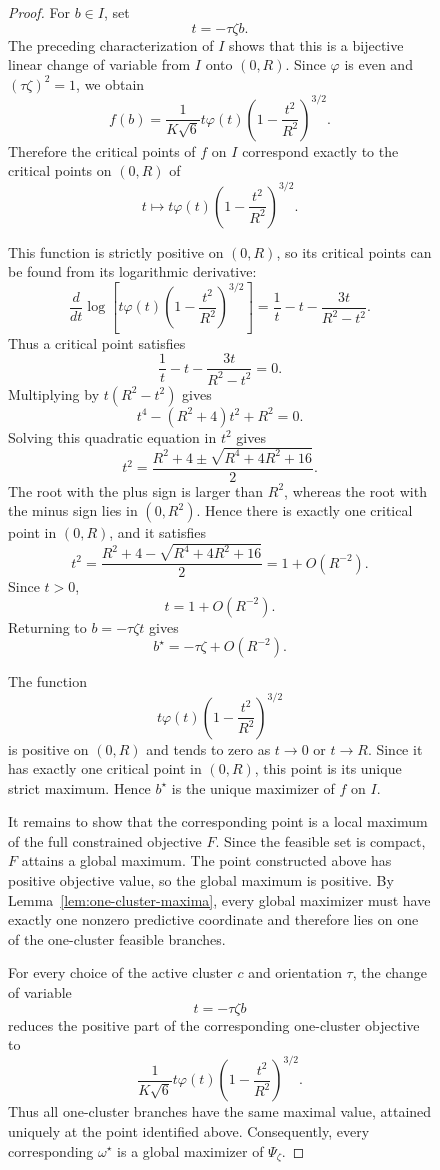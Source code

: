 \documentclass{article}
\begin{document}
\begin{figure}
\begin{proof}
For $b\in I$, set
\[
    t=-\tau\zeta b.
\]
The preceding characterization of $I$ shows that this is a bijective linear
change of variable from $I$ onto $(0,R)$. Since $\varphi$ is even and
$(\tau\zeta)^2=1$, we obtain
\[
    f(b)
    =
    \frac{1}{K\sqrt6}
    t\varphi(t)
    \left(1-\frac{t^2}{R^2}\right)^{3/2}.
\]
Therefore the critical points of $f$ on $I$ correspond exactly to the
critical points on $(0,R)$ of
\[
    t\longmapsto
    t\varphi(t)
    \left(1-\frac{t^2}{R^2}\right)^{3/2}.
\]

This function is strictly positive on $(0,R)$, so its critical points can be
found from its logarithmic derivative:
\[
    \frac{d}{dt}
    \log\left[
        t\varphi(t)
        \left(1-\frac{t^2}{R^2}\right)^{3/2}
    \right]
    =
    \frac1t-t-\frac{3t}{R^2-t^2}.
\]
Thus a critical point satisfies
\[
    \frac1t-t-\frac{3t}{R^2-t^2}=0.
\]
Multiplying by $t(R^2-t^2)$ gives
\[
    t^4-(R^2+4)t^2+R^2=0.
\]
Solving this quadratic equation in $t^2$ gives
\[
    t^2
    =
    \frac{R^2+4\pm\sqrt{R^4+4R^2+16}}{2}.
\]
The root with the plus sign is larger than $R^2$, whereas the root with the
minus sign lies in $(0,R^2)$. Hence there is exactly one critical point in
$(0,R)$, and it satisfies
\[
    t^2
    =
    \frac{
        R^2+4-\sqrt{R^4+4R^2+16}
    }{2}
    =
    1+O(R^{-2}).
\]
Since $t>0$,
\[
    t=1+O(R^{-2}).
\]
Returning to $b=-\tau\zeta t$ gives
\[
    b^\star
    =
    -\tau\zeta+O(R^{-2}).
\]



The function
\[
    t\varphi(t)
    \left(1-\frac{t^2}{R^2}\right)^{3/2}
\]
is positive on $(0,R)$ and tends to zero as $t\to0$ or $t\to R$.
Since it has exactly one critical point in $(0,R)$, this point is its
unique strict maximum. Hence $b^\star$ is the unique maximizer of $f$ on
$I$.

It remains to show that the corresponding point is a local maximum of the
full constrained objective $F$. Since the feasible set is compact, $F$
attains a global maximum. The point constructed above has positive objective
value, so the global maximum is positive. By
Lemma~\ref{lem:one-cluster-maxima}, every global maximizer must have exactly
one nonzero predictive coordinate and therefore lies on one of the
one-cluster feasible branches.

For every choice of the active cluster $c$ and orientation $\tau$, the
change of variable
\[
    t=-\tau\zeta b
\]
reduces the positive part of the corresponding one-cluster objective to
\[
    \frac{1}{K\sqrt6}
    t\varphi(t)
    \left(1-\frac{t^2}{R^2}\right)^{3/2}.
\]
Thus all one-cluster branches have the same maximal value, attained uniquely
at the point identified above. Consequently, every corresponding
$\omega^\star$ is a global maximizer of $\Psi_\zeta$.


\end{proof}
\end{figure}
\end{document}
